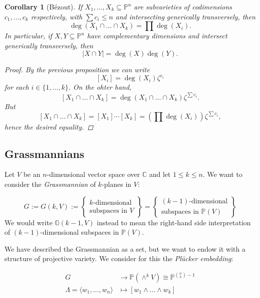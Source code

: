 \documentclass[12pt,a4paper]{amsart}
\theoremstyle{plain}
\newtheorem{cor}[thm]{Corollary}
\theoremstyle{definition}
\theoremstyle{remark}
\begin{document}
\begin{cor}[B\'{e}zout]
    If $X_{1},\ldots,X_{k}\subseteq \mathbb{P}^{n}$ are subvarieties of codimensions $c_{1},\ldots,c_{k}$ respectively, with $\sum c_{i}\leq n$ and intersecting generically transversely, then
    \[ \deg(X_{1}\cap \ldots \cap X_{k})=\prod \deg(X_{i}). \]
    In particular, if $X,Y\subseteq \mathbb{P}^{n}$ have complementary dimensions and intersect generically transversely, then
    \[ |X\cap Y|=\deg(X)\deg(Y). \]
    \begin{proof}
	By the previous proposition we can write
	\[ [X_{i}]=\deg(X_{i})\zeta^{c_{i}} \]
	for each $i\in \{1,\ldots,k\}$.
	On the ohter hand,
	\[ [X_{1}\cap \ldots\cap X_{k}]=\deg(X_{1}\cap\ldots\cap X_{k})\zeta^{\sum c_{i}}. \]
	But
	\[ [X_{1}\cap \ldots \cap X_{k}]=[X_{1}]\cdots [X_{k}]=\left(\prod \deg(X_{i})\right)\zeta^{\sum c_{i}}, \]
	hence the desired equality.
    \end{proof}
\end{cor}

\subsection{Grassmannians}

Let $V$ be an $n$-dimensional vector space over $\mathbb{C}$ and let $1\leq k\leq n$.
We want to consider the \textit{Grassmannian} of $k$-planes in $V$:

\[ G:=G(k,V):=\left\{ \begin{array}{c}
    k\text{-dimensional} \\
    \text{subspaces in }V
    \end{array}\right\}
    =\left\{ \begin{array}{c}
    (k-1)\text{-dimensional} \\
    \text{subspaces in }\mathbb{P}(V)
    \end{array} \right\}
\]
We would write $\mathbb{G}(k-1,V)$ instead to mean the right-hand side interpretation of $(k-1)$-dimensional subspaces in $\mathbb{P}(V)$.
	
We have described the Grassmannian as a set, but we want to endow it with a structure of projective variety.
We consider for this the \textit{Plücker embedding}:

\begin{align*}
    G & \longrightarrow \mathbb{P}(\wedge^{k}V)\cong \mathbb{P}^{\binom{n}{k}-1} \\
    \Lambda=\langle w_{1},\ldots,w_{n}\rangle & \longmapsto [w_{1}\wedge \ldots \wedge w_{k}]
\end{align*}
\end{document}
